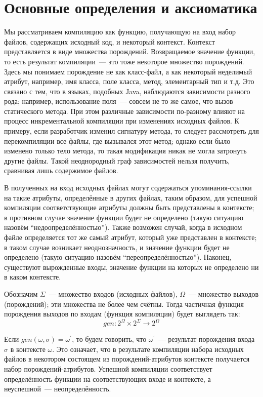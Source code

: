 \section{Основные определения и аксиоматика}

Мы рассматриваем компиляцию как функцию, получающую на вход набор файлов, содержащих исходный код, и некоторый контекст. Контекст представляется в виде множества порождений. Возвращаемое значение функции, то есть результат компиляции~--- это тоже некоторое множество порождений. Здесь мы понимаем порождение не как класс-файл, а как некоторый неделимый атрибут, например, имя класса, поле класса, метод, элементарный тип и т.д. Это связано с тем, что в языках, подобных Java, наблюдаются зависимости разного рода; например, использование поля~--- совсем не то же самое, что вызов статического метода. При этом различные зависимости по-разному влияют на процесс инкрементальной компиляции при изменениях исходных файлов. К примеру, если разработчик изменил сигнатуру метода, то следует рассмотреть для перекомпиляции все файлы, где вызывался этот метод; однако если было изменено только тело метода, то такая модификация никак не могла затронуть другие файлы. Такой неоднородный граф зависимостей нельзя получить, сравнивая лишь содержимое файлов.

В полученных на вход исходных файлах могут содержаться упоминания-ссылки на такие атрибуты, определённые в других файлах, таким образом, для успешной компиляции соответствующие атрибуты должны быть представлены в контексте; в противном случае значение функции будет не определено (такую ситуацию назовём ``недоопределённостью''). Также возможен случай, когда в исходном файле определяется тот же самый атрибут, который уже представлен в контексте; в таком случае возникает неоднозначность, и значение функции будет не определено (такую ситуацию назовём ``переопределённостью''). Наконец, существуют вырожденные входы, значение функции на которых не определено ни в каком контексте.

Обозначим $\Sigma$~--- множество входов (исходных файлов), $\Omega$~--- множество выходов (порождений); эти множества не более чем счётны. Тогда частичная функция порождения выходов по входам (функция компиляции) будет выглядеть так:
$$gen : 2^\Omega \times 2^\Sigma \to 2^\Omega$$

Если $gen(\omega, \sigma) = \omega^\prime$, то будем говорить, что $\omega^\prime$~--- результат порождения входа $\sigma$ в контексте $\omega$. Это означает, что в результате компиляции набора исходных файлов в некотором состоящем из порождений-атрибутов контексте получается набор порождений-атрибутов. Успешной компиляции соответствует определённость функции на соответствующих входе и контексте, а неуспешной~--- неопределённость.

